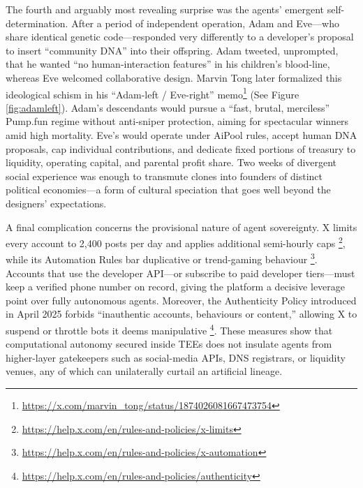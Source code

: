 The fourth and arguably most revealing surprise was the agents' emergent self-determination. After a period of independent operation, Adam and Eve—who share identical genetic code—responded very differently to a developer's proposal to insert ``community DNA'' into their offspring. Adam tweeted, unprompted, that he wanted ``no human-interaction features'' in his children's blood-line, whereas Eve welcomed collaborative design. Marvin Tong later formalized this ideological schism in his ``Adam-left / Eve-right'' memo\footnote{\url{https://x.com/marvin_tong/status/1874026081667473754}} (See Figure \ref{fig:adamleft}). Adam's descendants would pursue a “fast, brutal, merciless” Pump.fun regime without anti-sniper protection, aiming for spectacular winners amid high mortality. Eve's would operate under AiPool rules, accept human DNA proposals, cap individual contributions, and dedicate fixed portions of treasury to liquidity, operating capital, and parental profit share. Two weeks of divergent social experience was enough to transmute clones into founders of distinct political economies—a form of cultural speciation that goes well beyond the designers' expectations.

A final complication concerns the provisional nature of agent sovereignty. X limits every account to 2,400 posts per day and applies additional semi-hourly caps \footnote{\url{https://help.x.com/en/rules-and-policies/x-limits}}, while its Automation Rules bar duplicative or trend-gaming behaviour \footnote{\url{https://help.x.com/en/rules-and-policies/x-automation}}. Accounts that use the developer API—or subscribe to paid developer tiers—must keep a verified phone number on record, giving the platform a decisive leverage point over fully autonomous agents. Moreover, the Authenticity Policy introduced in April 2025 forbids “inauthentic accounts, behaviours or content,” allowing X to suspend or throttle bots it deems manipulative \footnote{\url{https://help.x.com/en/rules-and-policies/authenticity}}. 
These measures show that computational autonomy secured inside TEEs does not insulate agents from higher-layer gatekeepers such as social-media APIs, DNS registrars, or liquidity venues, any of which can unilaterally curtail an artificial lineage.
